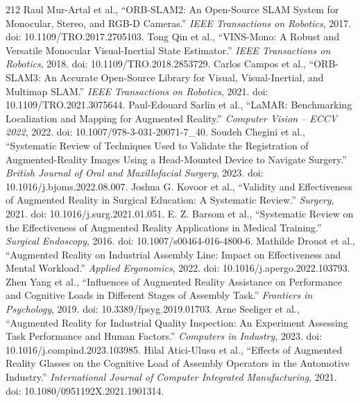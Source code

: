 \begin{thebibliography}{212}
 Raul Mur-Artal et al., ``{ORB-SLAM2}: An Open-Source {SLAM} System for Monocular, Stereo, and {RGB-D} Cameras.'' \emph{IEEE Transactions on Robotics}, 2017. doi: 10.1109/TRO.2017.2705103.
 Tong Qin et al., ``{VINS-Mono}: A Robust and Versatile Monocular Visual-Inertial State Estimator.'' \emph{IEEE Transactions on Robotics}, 2018. doi: 10.1109/TRO.2018.2853729.
 Carlos Campos et al., ``{ORB-SLAM3}: An Accurate Open-Source Library for Visual, Visual-Inertial, and Multimap {SLAM}.'' \emph{IEEE Transactions on Robotics}, 2021. doi: 10.1109/TRO.2021.3075644.
 Paul-Edouard Sarlin et al., ``{LaMAR}: Benchmarking Localization and Mapping for Augmented Reality.'' \emph{Computer Vision -- ECCV 2022}, 2022. doi: 10.1007/978-3-031-20071-7_40.
 Soudeh Chegini et al., ``Systematic Review of Techniques Used to Validate the Registration of Augmented-Reality Images Using a Head-Mounted Device to Navigate Surgery.'' \emph{British Journal of Oral and Maxillofacial Surgery}, 2023. doi: 10.1016/j.bjoms.2022.08.007.
 Joshua G. Kovoor et al., ``Validity and Effectiveness of Augmented Reality in Surgical Education: A Systematic Review.'' \emph{Surgery}, 2021. doi: 10.1016/j.surg.2021.01.051.
 E. Z. Barsom et al., ``Systematic Review on the Effectiveness of Augmented Reality Applications in Medical Training.'' \emph{Surgical Endoscopy}, 2016. doi: 10.1007/s00464-016-4800-6.
 Mathilde Drouot et al., ``Augmented Reality on Industrial Assembly Line: Impact on Effectiveness and Mental Workload.'' \emph{Applied Ergonomics}, 2022. doi: 10.1016/j.apergo.2022.103793.
 Zhen Yang et al., ``Influences of Augmented Reality Assistance on Performance and Cognitive Loads in Different Stages of Assembly Task.'' \emph{Frontiers in Psychology}, 2019. doi: 10.3389/fpsyg.2019.01703.
 Arne Seeliger et al., ``Augmented Reality for Industrial Quality Inspection: An Experiment Assessing Task Performance and Human Factors.'' \emph{Computers in Industry}, 2023. doi: 10.1016/j.compind.2023.103985.
 Hilal Atici-Ulusu et al., ``Effects of Augmented Reality Glasses on the Cognitive Load of Assembly Operators in the Automotive Industry.'' \emph{International Journal of Computer Integrated Manufacturing}, 2021. doi: 10.1080/0951192X.2021.1901314.

\end{thebibliography}
